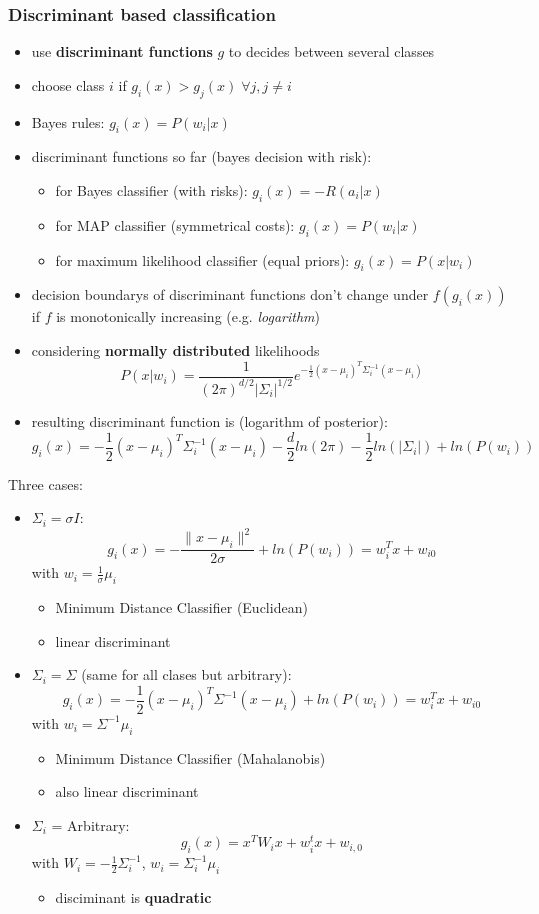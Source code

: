 \documentclass[11pt]{article}
\begin{document}
\subsubsection{Discriminant based classification}
\label{sec-9-2-4}
\begin{itemize}
\item use \textbf{discriminant functions} $g$ to decides between several classes
\item choose class $i$ if $g_i(x)>g_j(x) \; \forall j, j\neq i$
\item Bayes rules: $g_i(x) = P(w_i|x)$
\item discriminant functions so far (bayes decision with risk):
\begin{itemize}
\item for Bayes classifier (with risks): $g_i(x) = -R(a_i|x)$
\item for MAP classifier (symmetrical costs): $g_i(x) = P(w_i|x)$
\item for maximum likelihood classifier (equal priors): $g_i(x) = P(x|w_i)$
\end{itemize}
\item decision boundarys of discriminant functions don't change under $f(g_i(x))$
if $f$ is monotonically increasing (e.g. \emph{logarithm})
\item considering \textbf{normally distributed} likelihoods
      \[ P(x|w_i)=\frac{1}{(2\pi)^{d/2}|\Sigma_i|^{1/2}}e^{-\frac{1}{2}(x-\mu_i)^T
         \Sigma_i^{-1}(x-\mu_i)} \]
\item resulting discriminant function is (logarithm of posterior):
      \[ g_i(x) = -\frac{1}{2}(x-\mu_i)^T \Sigma_i^{-1}(x-\mu_i) - 
         \frac{d}{2}ln(2\pi) - \frac{1}{2}ln(|\Sigma_i|)+ln(P(w_i)) \]
\end{itemize}
Three cases:
\begin{itemize}
\item $\Sigma_i = \sigma I$: 
\[ g_i(x) = -\frac{\|x-\mu_i\|^2}{2\sigma}+ln(P(w_i)) = w_i^Tx+w_{i0} \]
with $w_i = \frac{1}{\sigma}\mu_i$
\begin{itemize}
\item Minimum Distance Classifier (Euclidean)
\item linear discriminant
\end{itemize}
\item $\Sigma_i = \Sigma$ (same for all clases but arbitrary):
\[ g_i(x) = -\frac{1}{2}(x-\mu_i)^T \Sigma^{-1}(x-\mu_i) + ln(P(w_i)) = w_i^T x+w_{i0} \]
with $w_i = \Sigma^{-1}\mu_i$
\begin{itemize}
\item Minimum Distance Classifier (Mahalanobis)
\item also linear discriminant
\end{itemize}
\item $\Sigma_i$ =  Arbitrary:
\[ g_i(x) = x^T W_i x +w_i^t x + w_{i,0} \]
with $W_i = -\frac{1}{2}\Sigma_i^{-1}$, $w_i = \Sigma_i^{-1}\mu_i$
\begin{itemize}
\item disciminant is \textbf{quadratic}
\end{itemize}
\end{itemize}
\end{document}
